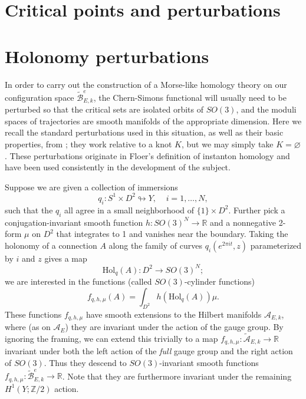 \documentclass[10pt,a4paper]{amsart}
\newcounter{qchap}
\newcommand{\qchapter}[1]{\refstepcounter{qchap}\setcounter{section}{0}\setcounter{equation}{0}\setcounter{theorem}{0}\renewcommand{\thesection}{\theqchap.\arabic{section}}\renewcommand{\theequation}{\theqchap.\arabic{equation}}\section*{#1}}
\newcommand{\chapter}[1]{\qchapter{#1}}
\theoremstyle{definition}
\theoremstyle{remark}
\numberwithin{figure}{qchap}
\begin{document}
\chapter{Critical points and perturbations}\label{chap:3}
\section{Holonomy perturbations}\label{sec:3d-pert}
In order to carry out the construction of a Morse-like homology theory on our configuration space $\widetilde{\mathcal B}^{e}_{E,k}$, the Chern-Simons functional will usually need to be perturbed so that the critical sets are isolated orbits of $SO(3)$, and the moduli spaces of trajectories are smooth manifolds of the appropriate dimension. Here we recall the standard perturbations used in this situation, as well as their basic properties, from \cite[Section~3.2]{KM1}; they work relative to a knot $K$, but we may simply take $K = \varnothing$. These perturbations originate in Floer's definition of instanton homology and have been used consistently in the development of the subject.

Suppose we are given a collection of immersions 
$$q_i: S^1 \times D^2 \looparrowright Y, \;\;\;\; i = 1, \dots, N,$$ 
such that the $q_i$ all agree in a small neighborhood of $\{1\} \times D^2$. Further pick a conjugation-invariant smooth function $h: SO(3)^N \to \mathbb R$ and a nonnegative 2-form $\mu$ on $D^2$ that integrates to 1 and vanishes near the boundary. Taking the holonomy of a connection $A$ along the family of curves $q_i(e^{2\pi i t},z)$ parameterized by $i$ and $z$ gives a map 
$$\text{Hol}_q(A): D^2 \to SO(3)^N;$$
we are interested in the functions (called $SO(3)$-cylinder functions) 
$$f_{q,h,\mu}(A) = \int_{D^2} h(\text{Hol}_q(A)) \mu.$$ 
These functions $f_{q,h,\mu}$ have smooth extensions to the Hilbert manifolds $\mathcal A_{E,k}$, where (as on $\mathcal A_E$) they are invariant under the action of the gauge group. By ignoring the framing, we can extend this trivially to a map $f_{q,h,\mu}: \widetilde{\mathcal A}_{E,k} \to \mathbb R$ invariant under both the left action of the \textit{full} gauge group and the right action of $SO(3)$. Thus they descend to $SO(3)$-invariant smooth functions $f_{q,h,\mu}: \widetilde{\mathcal B}^e_{E,k} \to \mathbb R$. Note that they are furthermore invariant under the remaining $H^1(Y;\mathbb Z/2)$ action. 
\end{document}
